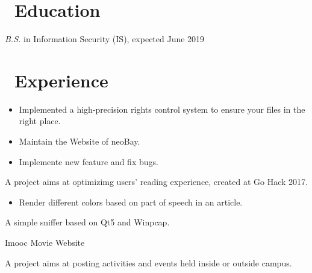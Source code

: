 \documentclass{resume}
\begin{document}



\section{\faGraduationCap\ Education}
\textit{B.S.} in Information Security (IS), expected June 2019

\section{\faUsers\ Experience}
\begin{itemize}
  \item Implemented a high-precision rights control system to ensure your files in the right place.
  \item Maintain the Website of neoBay.
\end{itemize}

\begin{itemize}
  \item Implemente new feature and fix bugs.
\end{itemize}

A project aims at optimizimg users' reading experience, created at Go Hack 2017.
\begin{itemize}
  \item Render different colors based on part of speech in an article.
\end{itemize}

A simple sniffer based on Qt5 and Winpcap.

Imooc Movie Website

A project aims at posting activities and events held inside or outside campus.
\end{document}
